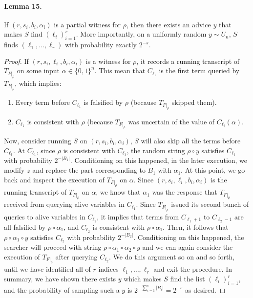 \documentclass[10pt,a4paper]{article}
\begin{document}
\paragraph{Lemma 15.} If $(r,s_i,b_i,\alpha_i)$ is a partial witness for $\rho$, then there exists an advice $y$ that makes $S$ find $(\ell_i)_{i=1}^r$. More importantly, on a uniformly random $y\sim U_n$, $S$ finds $(\ell_1,\ldots,\ell_r)$ with probability exactly $2^{-s}$.
\begin{proof}If $(r,s_i,\ell_i,b_i,\alpha_i)$ is a witness for $\rho$, it records a running transcript of $T_{F|_\rho}$ on some input $\alpha\in\{0,1\}^n$. This mean that $C_{\ell_1}$ is the first term queried by $T_{F|_\rho}$, which implies:
\begin{enumerate}\item Every term before $C_{\ell_1}$ is falsified by $\rho$ (because $T_{F|_\rho}$ skipped them).
\item $C_{\ell_1}$ is consistent with $\rho$ (because $T_{F|_\rho}$ was uncertain of the value of $C_{\ell_i}(\alpha)$.\end{enumerate}
Now, consider running $S$ on $(r,s_i,b_i,\alpha_i)$, $S$ will also skip all the terms before $C_{\ell_1}$. At $C_{\ell_1}$, since $\rho$ is consistent with $C_{\ell_1}$, the random string $\rho\circ y$ satisfies $C_{\ell_1}$ with probability $2^{-|B_1|}$. Conditioning on this happened, in the later execution, we modify $z$ and replace the part corresponding to $B_1$ with $\alpha_1$.
At this point, we go back and inspect the execution of $T_{F|_\rho}$ on $\alpha$. Since $(r,s_i,\ell_i,b_i,\alpha_i)$ is the running transcript of $T_{F|_\rho}$ on $\alpha$, we know that $\alpha_1$ was the response that $T_{F|_\rho}$ received from querying alive variables in $C_{\ell_1}$. Since $T_{F|_\rho}$ issued its second bunch of queries to alive variables in $C_{\ell_2}$, it implies that terms from $C_{\ell_1+1}$ to $C_{\ell_2-1}$ are all falsified by $\rho\circ\alpha_1$, and $C_{\ell_2}$ is consistent with $\rho\circ\alpha_1$. Then, it follows that $\rho\circ\alpha_1\circ y$ satisfies $C_{\ell_2}$ with probability $2^{-|B_2|}$. Conditioning on this happened, the searcher will proceed with string $\rho\circ\alpha_1\circ\alpha_2\circ y$ and we can again consider the execution of $T_{F|_\rho}$ after querying $C_{\ell_2}$. We do this argument so on and so forth, until we have identified all of $r$ indices $\ell_1,\ldots,\ell_r$ and exit the procedure. In summary, we have shown there exists $y$ which makes $S$ find the list $(\ell_i)_{i=1}^r$, and the probability of sampling such a $y$ is $2^{-\sum_{i=1}^c|B_i|}=2^{-s}$ as desired.\end{proof}
\end{document}
